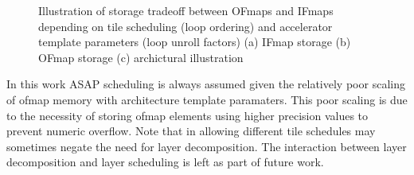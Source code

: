 \begin{figure}
    \centering
    \hspace{0.1cm} 
    \caption{Illustration of storage tradeoff between OFmaps and IFmaps depending on tile scheduling (loop ordering) and accelerator template parameters (loop unroll factors) (a) IFmap storage (b) OFmap storage (c) archictural illustration}
    \label{fig:Fmap_scaling}
\end{figure}

In this work ASAP scheduling is always assumed given the relatively poor scaling
of ofmap memory with architecture template paramaters. This poor scaling is due
to the necessity of storing ofmap elements using higher precision values to
prevent numeric overflow. Note that in allowing different tile schedules may
sometimes negate the need for layer decomposition. The interaction between layer
decomposition and layer scheduling is left as part of future work.  

